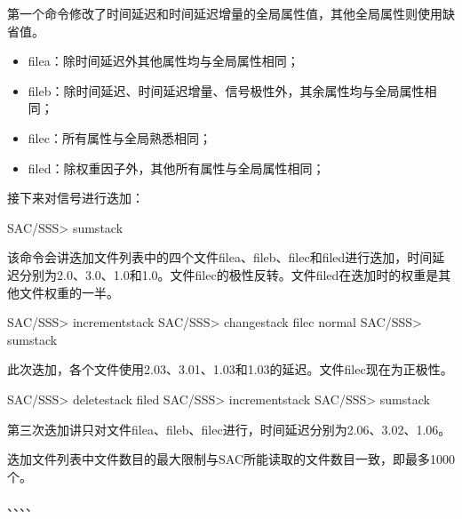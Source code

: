 第一个命令修改了时间延迟和时间延迟增量的全局属性值，其他全局属性则使用缺省值。
\begin{itemize}
\item filea：除时间延迟外其他属性均与全局属性相同；
\item fileb：除时间延迟、时间延迟增量、信号极性外，其余属性均与全局属性相同；
\item filec：所有属性与全局熟悉相同；
\item filed：除权重因子外，其他所有属性与全局属性相同；
\end{itemize}

接下来对信号进行迭加：
\begin{SACCode}
SAC/SSS> sumstack
\end{SACCode}

该命令会讲迭加文件列表中的四个文件filea、fileb、filec和filed进行迭加，时间延迟分别为2.0、3.0、1.0和1.0。文件filec的极性反转。文件filed在迭加时的权重是其他文件权重的一半。

\begin{SACCode}
SAC/SSS> incrementstack
SAC/SSS> changestack filec normal
SAC/SSS> sumstack
\end{SACCode}

此次迭加，各个文件使用2.03、3.01、1.03和1.03的延迟。文件filec现在为正极性。

\begin{SACCode}
SAC/SSS> deletestack filed
SAC/SSS> incrementstack
SAC/SSS> sumstack
\end{SACCode}

第三次迭加讲只对文件filea、fileb、filec进行，时间延迟分别为2.06、3.02、1.06。

迭加文件列表中文件数目的最大限制与SAC所能读取的文件数目一致，即最多1000个。

、、、、
